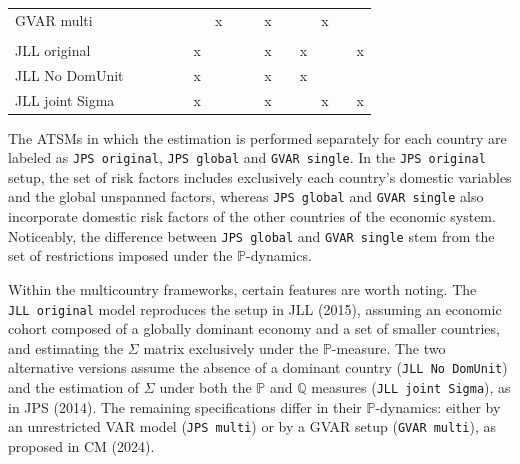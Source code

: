 \begin{table}[!h]
\begin{tabular}[t]{lcccccccccccccc}
\hspace{1em}GVAR multi &  &  &  &  &  & x &  &  & x &  &  & x &  & \\
\addlinespace[0.3em]
\multicolumn{15}{l}{\textbf{Restricted VAR (JLL)}}\\
\hspace{1em}JLL original &  &  &  &  & x &  &  &  & x &  & x &  &  & x\\
\hspace{1em}JLL No DomUnit &  &  &  &  & x &  &  &  & x &  & x &  &  & \\
\hspace{1em}JLL joint Sigma &  &  &  &  & x &  &  &  & x &  &  & x &  & x\\
\bottomrule
\end{tabular}
\end{table}

\vspace{-2.5em}
\begin{center}
\captionsetup{type=table}
\caption*{\footnotesize Note: Risk factor dynamics under the $\mathbb{P}$-measure may follow either an unrestricted (UR) or a restricted (R) specification. The set of restrictions present in the JLL-based and GVAR-based models are described in \cite{JotikasthiraLeLundblad2015} and \cite{CandelonMoura2024}, respectively. The estimation of the $\Sigma$ matrix is done either exclusively with the other parameters of the $\mathbb{P}$-dynamics (\textit{P} column) or jointly under both $\mathbb{P}$- and $\mathbb{Q}$-parameters (\textit{P and Q} column). \textit{Dom. Eco.} relates to the presence of a dominant economy. The entries featuring \textit{x} indicate that the referred characteristic is part of the model.}
\end{center}

The ATSMs in which the estimation is performed separately for each country are labeled as \texttt{JPS\ original}, \texttt{JPS\ global} and \texttt{GVAR\ single}. In the \texttt{JPS\ original} setup, the set of risk factors includes exclusively each country's domestic variables and the global unspanned factors, whereas \texttt{JPS\ global} and \texttt{GVAR\ single} also incorporate domestic risk factors of the other countries of the economic system. Noticeably, the difference between \texttt{JPS\ global} and \texttt{GVAR\ single} stem from the set of restrictions imposed under the \(\mathbb{P}\)-dynamics.

Within the multicountry frameworks, certain features are worth noting. The \texttt{JLL\ original} model reproduces the setup in JLL (2015), assuming an economic cohort composed of a globally dominant economy and a set of smaller countries, and estimating the \(\Sigma\) matrix exclusively under the \(\mathbb{P}\)-measure. The two alternative versions assume the absence of a dominant country (\texttt{JLL\ No\ DomUnit}) and the estimation of \(\Sigma\) under both the \(\mathbb{P}\) and \(\mathbb{Q}\) measures (\texttt{JLL\ joint\ Sigma}), as in JPS (2014). The remaining specifications differ in their \(\mathbb{P}\)-dynamics: either by an unrestricted VAR model (\texttt{JPS\ multi}) or by a GVAR setup (\texttt{GVAR\ multi}), as proposed in CM (2024).

